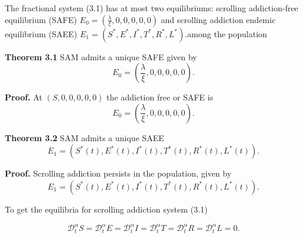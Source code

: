 \documentclass[10pt]{NSP1}
\newcommand{\CD}{\mathcal{D}}
\begin{document}
	The fractional system (3.1) has at most two equilibriums: scrolling addiction-free equilibrium (SAFE) $E_0 = \left( \frac{\lambda}{\xi}, 0, 0, 0, 0, 0 \right)$ and scrolling addiction endemic equilibrium (SAEE) $E_1 = \left( S^\ast, E^\ast, I^\ast, T^\ast, R^\ast, L^\ast \right)$.among the population
	
	\textbf{Theorem 3.1} SAM admits a unique SAFE given by
	\begin{equation}
		E_0 = \left( \frac{\lambda}{\xi}, 0, 0, 0, 0, 0 \right).
		\tag{3.13}
	\end{equation}
	
	\textbf{Proof.} At $(S,0,0,0,0,0)$ the addiction free or SAFE is
	\begin{equation}
		E_0 = \left( \frac{\lambda}{\xi}, 0, 0, 0, 0, 0 \right).
		\tag{3.14}
	\end{equation}
	
	\textbf{Theorem 3.2} SAM admits a unique SAEE
	\begin{equation}
		E_1 = \left( S^\ast(t), E^\ast(t), I^\ast(t), T^\ast(t), R^\ast(t), L^\ast(t) \right).
		\tag{3.15}
	\end{equation}
	
	\textbf{Proof.} Scrolling addiction persists in the population, given by
	\begin{equation}
		E_1 = \left( S^\ast(t), E^\ast(t), I^\ast(t), T^\ast(t), R^\ast(t), L^\ast(t) \right).
	\end{equation}
	
	To get the equilibria for scrolling addiction system (3.1)
	
	\begin{equation}
		\CD_t^\alpha S = \CD_t^\alpha E = \CD_t^\alpha I = \CD_t^\alpha T = \CD_t^\alpha R = \CD_t^\alpha L = 0.
		\tag{3.16}
	\end{equation}
	
\end{document}

